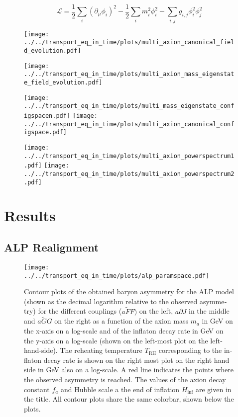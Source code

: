\documentclass[master,       %
               twoside,        %
               BCOR10mm,       %
               english,ngerman, %
               ]{GAUBM}
\begin{document}
\begin{otherlanguage}{english}
\begin{equation}
	\mathcal{L} = \frac{1}{2} \sum_i \left( \partial_\mu \phi_i \right)^2 - \frac{1}{2} \sum_i m_i^2 \phi_i^2 - \sum_{i, j}
	g_{i, j} \phi_i^2 \phi_j^2
\end{equation}

\begin{figure}[h]
    \texttt{[image: ../../transport\_eq\_in\_time/plots/multi\_axion\_canonical\_field\_evolution.pdf]}
    \caption{}
\end{figure}

\begin{figure}[h]
    \texttt{[image: ../../transport\_eq\_in\_time/plots/multi\_axion\_mass\_eigenstate\_field\_evolution.pdf]}
    \caption{}
\end{figure}

\begin{figure}[h]
    \texttt{[image: ../../transport\_eq\_in\_time/plots/multi\_mass\_eigenstate\_configspacen.pdf]}
    \texttt{[image: ../../transport\_eq\_in\_time/plots/multi\_axion\_canonical\_configspace.pdf]}
    \caption{}
\end{figure}

\begin{figure}[h]
    \texttt{[image: ../../transport\_eq\_in\_time/plots/multi\_axion\_powerspectrum1.pdf]}
    \texttt{[image: ../../transport\_eq\_in\_time/plots/multi\_axion\_powerspectrum2.pdf]}
    \caption{}
\end{figure}






\chapter{Results}

\section{ALP Realignment}

\begin{figure}[h]
    \texttt{[image: ../../transport\_eq\_in\_time/plots/alp\_paramspace.pdf]}
    \caption{Contour plots of the obtained baryon asymmetry  for the ALP model (shown as the decimal logarithm relative to the observed asymmetry) for the different couplings ($a\tilde{F}F)$ on the left, $a\partial J$ in the middle and $a \tilde{G} G$ on the right as a function of the axion mass $m_a$ in GeV on the x-axis on a log-scale and of the inflaton decay rate in GeV on the y-axis on a log-scale (shown on the left-most plot on the left-hand-side). The reheating temperature $T_\mathrm{RH}$ corresponding to the inflaton decay rate is shown on the right most plot on the right hand side in GeV also on a log-scale. A red line indicates the points where the observed asymmetry is reached. The values of the axion decay constant $f_a$ and Hubble scale a the end of inflation $H_\mathrm{inf}$ are given in the title. All contour plots share the same colorbar, shown below the plots.}
\end{figure}


\end{otherlanguage}
\end{document}
